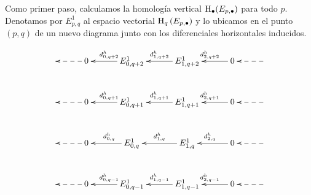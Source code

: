 \documentclass[a4paper,oneside,fleqn,11pt,../tesis.tex]{subfiles}
\begin{document}
Como primer paso, calculamos la homología vertical $\operatorname{H}_{\bullet}(E_{p, \bullet})$ para todo $p$. Denotamos por $E_{p, q}^{1}$
al espacio vectorial $\operatorname{H}_{q}\left(E_{p, \bullet}\right)$ y lo ubicamos en el punto $(p, q)$  de un nuevo diagrama junto con los diferenciales horizontales inducidos. 

\begin{align*}
    \xymatrix@=3em{
        & 0 \ar@{-->}[l] & E^1_{0, q + 2} \ar[l]_{d^{h}_{0, q + 2}}
            & E^1_{1,q + 2} \ar[l]_{d^{h}_{1, q + 2}} & 0 \ar[l]_{d^{h}_{2, q + 2}}  & \ar@{-->}[l]\\
        & 0 \ar@{-->}[l] & E^1_{0, q + 1} \ar[l]_{d^{h}_{0, q + 1}} 
            & E^1_{1,q + 1} \ar[l]_{d^{h}_{1, q + 1}} & 0 \ar[l]_{d^{h}_{2, q + 1}} & \ar@{-->}[l]\\
        & 0 \ar@{-->}[l] & E^1_{0, q} \ar[l]_{d^{h}_{0, q}} 
            & E^1_{1,q} \ar[l]_{d^{h}_{1, q}}  & 0 \ar[l]_{d^{h}_{2, q}}  &\ar@{-->}[l]\\
        & 0  \ar@{-->}[l]  & E^{1}_{0, q - 1} \ar[l]_{d^{h}_{0, q - 1}}  & E^{1}_{1, q - 1} \ar[l]_{d^{h}_{1, q - 1}} & 0 \ar[l]_{d^{h}_{2, q - 1}}  &  \ar@{-->}[l]
    }
\end{align*}
\end{document}
